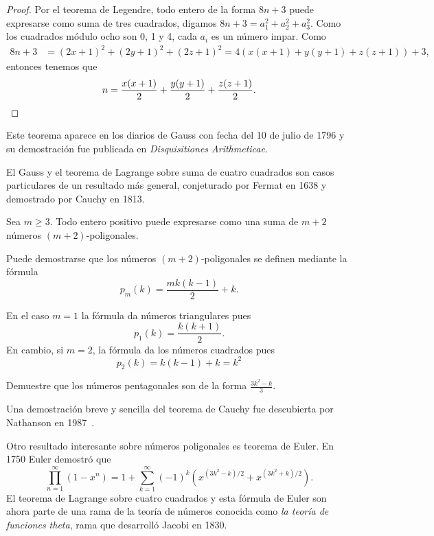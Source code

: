\begin{proof}
	Por el teorema de Legendre, todo entero de la forma $8n+3$ puede expresarse
	como suma de tres cuadrados, digamos $8n+3=a_1^2+a_2^2+a_3^2$. Como los
	cuadrados módulo ocho son 0, 1 y 4, cada $a_i$ es un número impar. Como 
	\begin{align*}
		8n+3&=(2x+1)^2+(2y+1)^2+(2z+1)^2
		=4(x(x+1)+y(y+1)+z(z+1))+3,
	\end{align*}
	entonces tenemos que 
	\[
		n=\frac{x(x+1)}{2}+\frac{y(y+1)}{2}+\frac{z(z+1)}{2}.\qedhere
	\]
\end{proof}

Este teorema aparece en los diarios de Gauss con fecha del 10 de julio de 1796
y su demostración fue publicada en \emph{Disquisitiones Arithmeticae}.  

El Gauss y el teorema de Lagrange sobre suma de cuatro cuadrados son
casos particulares de un resultado más general, conjeturado por Fermat en 1638
y demostrado por Cauchy en 1813. 

\begin{theorem}[Cauchy]
\label{thm:Cauchy}
    Sea $m\geq3$. Todo entero positivo puede
    expresarse como una suma de $m+2$ números $(m+2)$-poligonales.
\end{theorem}

Puede demostrarse que los números
$(m+2)$-poligonales se definen mediante la fórmula
\[
	p_m(k)=\frac{mk(k-1)}{2}+k.
\]

En el caso $m=1$ la fórmula da números triangulares pues
\[
	p_1(k)=\frac{k(k+1)}{2}.
\]
En cambio, si 
$m=2$, la fórmula da los números cuadrados pues
\[
p_2(k)=k(k-1)+k=k^2
\]

\begin{exercise}
	Demuestre que los números pentagonales son de la forma
	$\displaystyle{\frac{3k^2-k}{3}}$. 
\end{exercise}

Una demostración
breve y sencilla del teorema de Cauchy fue descubierta por Nathanson en
1987~\cite{MR866422}.

Otro resultado interesante sobre números poligonales es teorema de Euler. 
En 1750 Euler demostró que
\[
	\prod_{n=1}^\infty(1-x^n)=1+\sum_{k=1}^\infty (-1)^k\left(x^{(3k^2-k)/2}+x^{(3k^2+k)/2}\right).
\]
El teorema de Lagrange sobre cuatro cuadrados y esta fórmula de Euler son ahora
parte de una rama de la teoría de números conocida como
\emph{la teoría de funciones theta}, rama que desarrolló Jacobi en 1830. 

